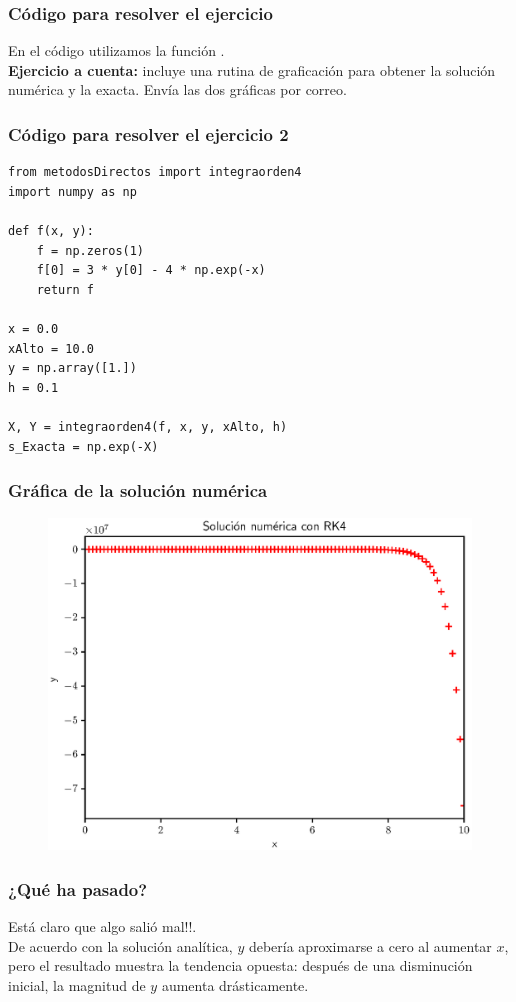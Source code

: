 \documentclass[12pt]{beamer}
\begin{document}
\begin{frame}
\frametitle{Código para resolver el ejercicio}
En el código utilizamos la función .
\\
\bigskip
\pause
\textbf{Ejercicio a cuenta: } incluye una rutina de graficación para obtener la solución numérica y la exacta. Envía las dos gráficas por correo.
\end{frame}
\begin{frame}
\frametitle{Código para resolver el ejercicio 2}
\begin{lstlisting}[caption=Código con el método RK4 que resuelve el ejercicio]
from metodosDirectos import integraorden4
import numpy as np

def f(x, y):
	f = np.zeros(1)
	f[0] = 3 * y[0] - 4 * np.exp(-x)
	return f

x = 0.0
xAlto = 10.0
y = np.array([1.])
h = 0.1

X, Y = integraorden4(f, x, y, xAlto, h)
s_Exacta = np.exp(-X)
\end{lstlisting}
\end{frame}
\begin{frame}
\frametitle{Gráfica de la solución numérica}
\begin{figure}
	\centering
	\includegraphics[scale=0.545]{Imagenes/plot_rk4_ejercicio_02_01.eps}
\end{figure}
\end{frame}
\begin{frame}
\frametitle{¿Qué ha pasado?}
Está claro que algo salió mal!!.
\\
\bigskip
\pause
De acuerdo con la solución analítica, $y$ debería aproximarse a cero al aumentar $x$, \pause pero el resultado muestra la tendencia opuesta: después de una disminución inicial, la magnitud de $y$ aumenta drásticamente.
\end{frame}
\end{document}
